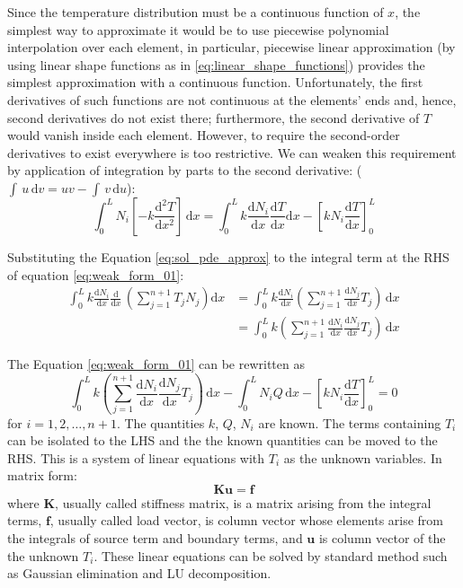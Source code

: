 Since the temperature distribution must be a continuous function of $x$,
the simplest way to approximate it would be to use piecewise polynomial
interpolation over each element, in particular, piecewise linear approximation
(by using linear shape functions as in \eqref{eq:linear_shape_functions})
provides the simplest approximation with a continuous function.
Unfortunately, the first derivatives of such functions are not continuous
at the elements' ends and, hence, second derivatives do not exist there;
furthermore, the second derivative of $T$ would vanish inside each element.
However, to require the second-order derivatives to exist everywhere is
too restrictive.
We can weaken this requirement by application of integration by parts to
the second derivative: ($\int\,u\,\mathrm{d}v = uv - \int\,v\,\mathrm{d}u$):
\begin{equation}
\int_{0}^{L} N_{i} \left[ -k\frac{\mathrm{d}^2 T}{\mathrm{d}x^2} \right]\,\mathrm{d}x =
\int_{0}^{L} k \frac{\mathrm{d} N_{i}}{\mathrm{d}x}
\frac{\mathrm{d} T}{\mathrm{d}x} \mathrm{d}x -
\left[ k N_{i} \frac{\mathrm{d}T}{\mathrm{d}x} \right]_{0}^{L}
\label{eq:weak_form_01}
\end{equation}

Substituting the Equation \eqref{eq:sol_pde_approx} to the integral
term at the RHS of equation \eqref{eq:weak_form_01}:
\begin{align}
\int_{0}^{L} k \frac{\mathrm{d} N_{i}}{\mathrm{d}x}
\frac{\mathrm{d}}{\mathrm{d}x}\, \left( \sum_{j=1}^{n+1} T_{j} N_{j} \right) \mathrm{d}x & =
\int_{0}^{L} k \frac{\mathrm{d} N_{i}}{\mathrm{d}x}
\left( \sum_{j=1}^{n+1} \frac{\mathrm{d}N_{j}}{\mathrm{d}x} T_{j} \right)\, \mathrm{d}x \\
& = \int_{0}^{L} k
\left( \sum_{j=1}^{n+1}
\frac{\mathrm{d} N_{i}}{\mathrm{d}x}
\frac{\mathrm{d}N_{j}}{\mathrm{d}x} T_{j} \right)\, \mathrm{d}x
\end{align}

The Equation \eqref{eq:weak_form_01} can be rewritten as
\begin{equation}
\int_{0}^{L} k
\left( \sum_{j=1}^{n+1}
\frac{\mathrm{d} N_{i}}{\mathrm{d}x}
\frac{\mathrm{d}N_{j}}{\mathrm{d}x} T_{j} \right)\, \mathrm{d}x -
\int_{0}^{L} N_{i} Q\, \mathrm{d}x -
\left[ k N_{i} \frac{\mathrm{d}T}{\mathrm{d}x} \right]_{0}^{L} = 0
\label{eq:weak_form_02}
\end{equation}
for $i=1,2,\ldots,n+1$. The quantities $k$, $Q$, $N_{i}$ are known.
The terms containing $T_{i}$ can be isolated to the LHS and the
the known quantities can be moved to the RHS. This is a system
of linear equations with $T_{i}$ as the unknown variables. In matrix form:
\begin{equation}
\mathbf{K} \mathbf{u} = \mathbf{f}
\label{eq:linear_system}
\end{equation}
where $\mathbf{K}$, usually called stiffness matrix,
is a matrix arising from the integral terms,
$\mathbf{f}$, usually called load vector, is
column vector whose elements arise from
the integrals of source term and boundary terms,
and $\mathbf{u}$ is column vector of the the unknown $T_{i}$.
These linear equations
can be solved by standard method such as Gaussian elimination and LU decomposition.


